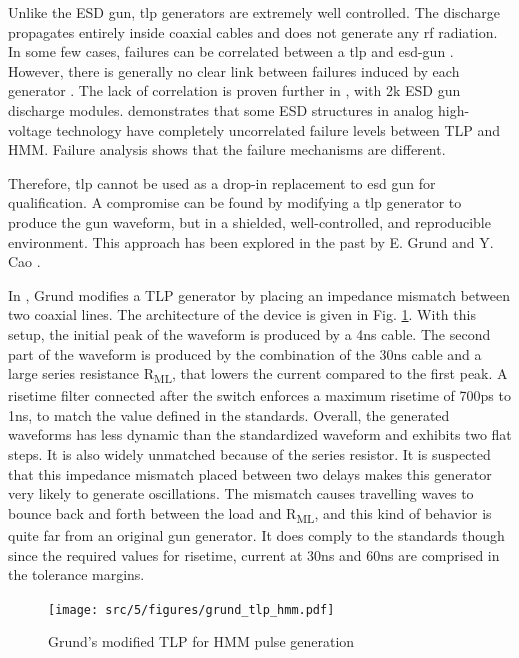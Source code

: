 Unlike the ESD gun, \gls{tlp} generators are extremely well controlled.
The discharge propagates entirely inside coaxial cables and does not generate any \gls{rf} radiation.
In some few cases, failures can be correlated between a \gls{tlp} and \gls{esd-gun} \cite{correlation-system-level-esd-tlp}.
However, there is generally no clear link between failures induced by each generator \cite{miscorrelation-esd-hmm}.
The lack of correlation is proven further in \cite{correlation-system-level-esd-tlp}, with 2k\textOmega{} ESD gun discharge modules.
\cite{correlation-system-level-esd-tlp} demonstrates that some ESD structures in analog high-voltage technology have completely uncorrelated failure levels between TLP and HMM. Failure analysis shows that the failure mechanisms are different.

Therefore, \gls{tlp} cannot be used as a drop-in replacement to \gls{esd} gun for qualification.
A compromise can be found by modifying a \gls{tlp} generator to produce the gun waveform, but in a shielded, well-controlled, and reproducible environment.
This approach has been explored in the past by E. Grund \cite{iec61000-tlp} and Y. Cao \cite{tlp-based-hmm}.

In \cite{iec61000-tlp}, Grund modifies a TLP generator by placing an impedance mismatch between two coaxial lines.
The architecture of the device is given in Fig. \ref{fig:grund_tlp_hmm}.
With this setup, the initial peak of the waveform is produced by a 4ns cable.
The second part of the waveform is produced by the combination of the 30ns cable and a large series resistance R\textsubscript{ML}, that lowers the current compared to the first peak.
A risetime filter connected after the switch enforces a maximum risetime of 700ps to 1ns, to match the value defined in the standards.
Overall, the generated waveforms has less dynamic than the standardized waveform and exhibits two flat steps.
It is also widely unmatched because of the series resistor.
It is suspected that this impedance mismatch placed between two delays makes this generator very likely to generate oscillations.
The mismatch causes travelling waves to bounce back and forth between the load and R\textsubscript{ML}, and this kind of behavior is quite far from an original gun generator.
It does comply to the standards though since the required values for risetime, current at 30ns and 60ns are comprised in the tolerance margins.

\begin{figure}[!h]
  \centering
  \texttt{[image: src/5/figures/grund\_tlp\_hmm.pdf]}
  \caption{Grund's modified TLP for HMM pulse generation}
  \label{fig:grund_tlp_hmm}
\end{figure}

